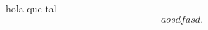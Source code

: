 \documentclass[a4paper]{article}
\begin{document}
    hola que tal
    \[
    aosdfasd
    .\] 
\end{document}
